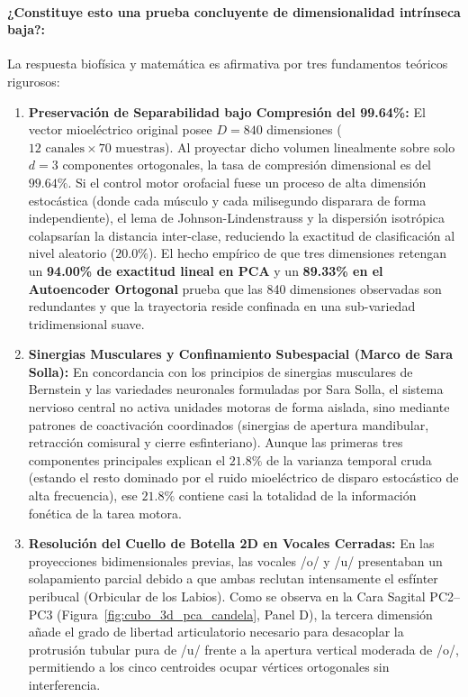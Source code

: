 \documentclass[11pt,a4paper,openany]{book}
\theoremstyle{definition}
\begin{document}
\paragraph{¿Constituye esto una prueba concluyente de dimensionalidad intrínseca baja?:}
La respuesta biofísica y matemática es afirmativa por tres fundamentos teóricos rigurosos:
\begin{enumerate}
    \item \textbf{Preservación de Separabilidad bajo Compresión del 99.64\%:}
    El vector mioeléctrico original posee $D = 840$ dimensiones ($12 \text{ canales} \times 70 \text{ muestras}$). Al proyectar dicho volumen linealmente sobre solo $d = 3$ componentes ortogonales, la tasa de compresión dimensional es del $99.64\%$. Si el control motor orofacial fuese un proceso de alta dimensión estocástica (donde cada músculo y cada milisegundo disparara de forma independiente), el lema de Johnson-Lindenstrauss y la dispersión isotrópica colapsarían la distancia inter-clase, reduciendo la exactitud de clasificación al nivel aleatorio ($20.0\%$). El hecho empírico de que tres dimensiones retengan un \textbf{94.00\% de exactitud lineal en PCA} y un \textbf{89.33\% en el Autoencoder Ortogonal} prueba que las 840 dimensiones observadas son redundantes y que la trayectoria reside confinada en una sub-variedad tridimensional suave.
    \item \textbf{Sinergias Musculares y Confinamiento Subespacial (Marco de Sara Solla):}
    En concordancia con los principios de sinergias musculares de Bernstein y las variedades neuronales formuladas por Sara Solla, el sistema nervioso central no activa unidades motoras de forma aislada, sino mediante patrones de coactivación coordinados (sinergias de apertura mandibular, retracción comisural y cierre esfinteriano). Aunque las primeras tres componentes principales explican el $21.8\%$ de la varianza temporal cruda (estando el resto dominado por el ruido mioeléctrico de disparo estocástico de alta frecuencia), ese $21.8\%$ contiene casi la totalidad de la información fonética de la tarea motora.
    \item \textbf{Resolución del Cuello de Botella 2D en Vocales Cerradas:}
    En las proyecciones bidimensionales previas, las vocales /o/ y /u/ presentaban un solapamiento parcial debido a que ambas reclutan intensamente el esfínter peribucal (Orbicular de los Labios). Como se observa en la Cara Sagital PC2--PC3 (Figura~\ref{fig:cubo_3d_pca_candela}, Panel D), la tercera dimensión añade el grado de libertad articulatorio necesario para desacoplar la protrusión tubular pura de /u/ frente a la apertura vertical moderada de /o/, permitiendo a los cinco centroides ocupar vértices ortogonales sin interferencia.
\end{enumerate}
\end{document}
